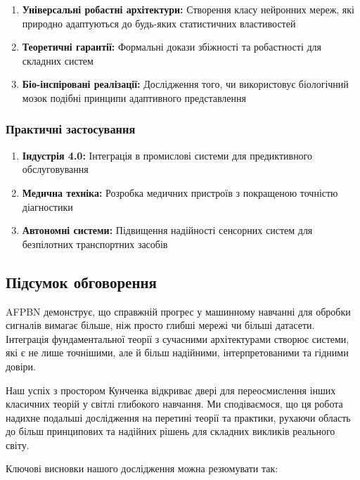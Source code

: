 \documentclass[12pt,a4paper]{article}
\begin{document}
\begin{enumerate}
	\item \textbf{Універсальні робастні архітектури:} Створення класу нейронних мереж, які природно адаптуються до будь-яких статистичних властивостей
	\item \textbf{Теоретичні гарантії:} Формальні докази збіжності та робастності для складних систем
	\item \textbf{Біо-інспіровані реалізації:} Дослідження того, чи використовує біологічний мозок подібні принципи адаптивного представлення
\end{enumerate}

\subsubsection{Практичні застосування}

\begin{enumerate}
	\item \textbf{Індустрія 4.0:} Інтеграція в промислові системи для предиктивного обслуговування
	\item \textbf{Медична техніка:} Розробка медичних пристроїв з покращеною точністю діагностики
	\item \textbf{Автономні системи:} Підвищення надійності сенсорних систем для безпілотних транспортних засобів
\end{enumerate}

\subsection{Підсумок обговорення}

AFPBN демонструє, що справжній прогрес у машинному навчанні для обробки сигналів вимагає більше, ніж просто глибші мережі чи більші датасети. Інтеграція фундаментальної теорії з сучасними архітектурами створює системи, які є не лише точнішими, але й більш надійними, інтерпретованими та гідними довіри.

Наш успіх з простором Кунченка відкриває двері для переосмислення інших класичних теорій у світлі глибокого навчання. Ми сподіваємося, що ця робота надихне подальші дослідження на перетині теорії та практики, рухаючи область до більш принципових та надійних рішень для складних викликів реального світу.

Ключові висновки нашого дослідження можна резюмувати так:
\end{document}
